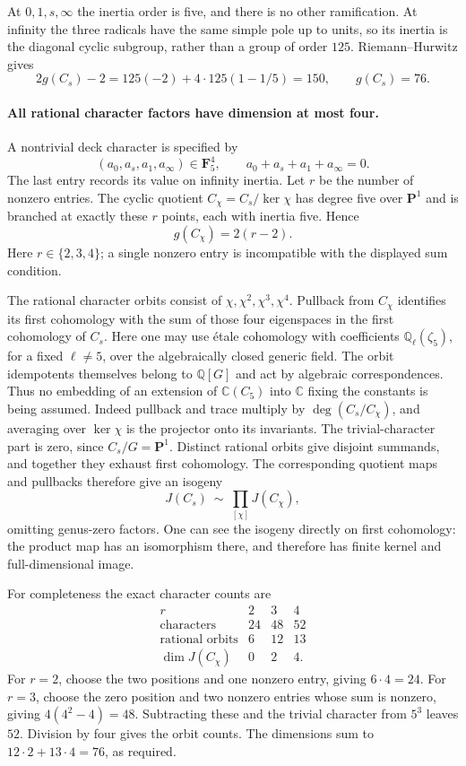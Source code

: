 \documentclass[11pt]{article}
\newcommand{\Q}{\mathbb Q}\newcommand{\C}{\mathbb C}\newcommand{\Z}{\mathbb Z}\newcommand{\R}{\mathbb R}\newcommand{\A}{\mathbb A}\newcommand{\OO}{\mathcal O}
\theoremstyle{definition}\newtheorem{definition}[theorem]{Definition}\newtheorem{remark}[theorem]{Remark}
\begin{document}
At $0,1,s,\infty$ the inertia order is five, and there
is no other ramification.  At infinity the three radicals
have the same simple pole up to units, so its inertia is
the diagonal cyclic subgroup, rather than a group of
order $125$.  Riemann--Hurwitz gives
\[
 2g(C_s)-2=125(-2)+4\cdot125(1-1/5)=150,
                     \qquad g(C_s)=76.          \tag{C28b}
\]

\paragraph{All rational character factors have dimension at most four.}
A nontrivial deck character is specified by
\[
 (a_0,a_s,a_1,a_\infty)\in\mathbf F_5^4,
       \qquad a_0+a_s+a_1+a_\infty=0.
\]
The last entry records its value on infinity inertia.
Let $r$ be the number of nonzero entries.  The cyclic
quotient $C_\chi=C_s/\ker\chi$ has degree five over
$\mathbf P^1$ and is branched at exactly these $r$
points, each with inertia five.  Hence
\[
                      g(C_\chi)=2(r-2).          \tag{C28c}
\]
Here $r\in\{2,3,4\}$; a single nonzero entry is
incompatible with the displayed sum condition.

The rational character orbits consist of
$\chi,\chi^2,\chi^3,\chi^4$.  Pullback from $C_\chi$
identifies its first cohomology with the sum
of those four eigenspaces in the first cohomology of $C_s$.
Here one may use \'etale cohomology with coefficients
$\Q_\ell(\zeta_5)$, for a fixed $\ell\ne5$, over
the algebraically closed generic field.  The orbit
idempotents themselves belong to $\Q[G]$ and act by
algebraic correspondences.  Thus no embedding of an
extension of $\C(C_5)$ into $\C$ fixing the constants
is being assumed.
Indeed pullback and trace multiply by $\deg(C_s/C_\chi)$,
and averaging over $\ker\chi$ is the projector onto
its invariants.  The trivial-character part is zero,
since $C_s/G=\mathbf P^1$.
Distinct rational orbits give disjoint summands, and
together they exhaust first cohomology.  The corresponding
quotient maps and pullbacks therefore give an isogeny
\[
             J(C_s)\ \sim\ \prod_{[\chi]} J(C_\chi),
                                                        \tag{C28d}
\]
omitting genus-zero factors.  One can see the isogeny
directly on first cohomology: the product map has an
isomorphism there, and therefore has finite kernel and
full-dimensional image.

For completeness the exact character counts are
\[
\begin{array}{c|ccc}
 r&2&3&4\\\hline
 \text{characters}&24&48&52\\
 \text{rational orbits}&6&12&13\\
 \dim J(C_\chi)&0&2&4 .
\end{array}                                             \tag{C28e}
\]
For $r=2$, choose the two positions and one nonzero
entry, giving $6\cdot4=24$.  For $r=3$, choose the
zero position and two nonzero entries whose sum is
nonzero, giving $4(4^2-4)=48$.  Subtracting these and
the trivial character from $5^3$ leaves $52$.
Division by four gives the orbit counts.  The dimensions
sum to $12\cdot2+13\cdot4=76$, as required.
\end{document}
